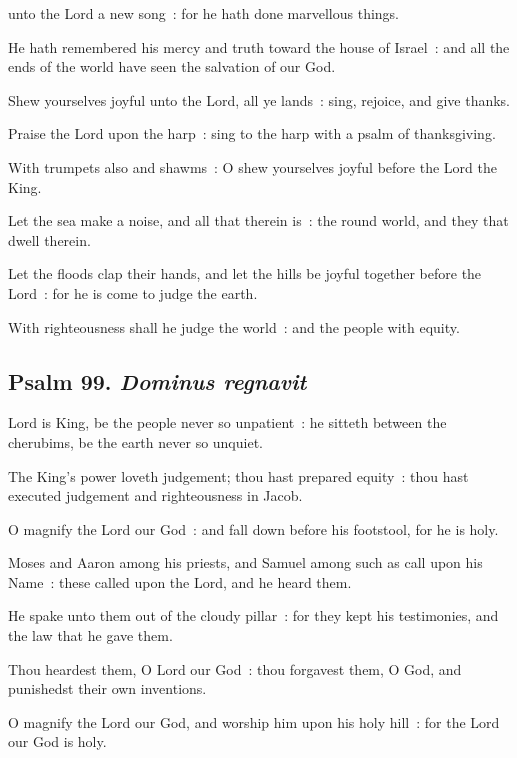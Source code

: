  unto the Lord a new song~: for he hath done marvellous things.\par
{}
He hath remembered his mercy and truth toward the house of Israel~: and all the ends of the world have seen the salvation of our God.\par
{}Shew yourselves joyful unto the Lord, all ye lands~: sing, rejoice, and give thanks.\par
{}Praise the Lord upon the harp~: sing to the harp with a psalm of thanksgiving.\par
{}With trumpets also and shawms~: O shew yourselves joyful before the Lord the King.\par
{}Let the sea make a noise, and all that therein is~: the round world, and they that dwell therein.\par
{}Let the floods clap their hands, and let the hills be joyful together before the Lord~: for he is come to judge the earth.\par
{}With righteousness shall he judge the world~: and the people with equity.\par

\subsection{Psalm 99. \textit{Dominus regnavit}}

 Lord is King, be the people never so unpatient~: he sitteth between the cherubims, be the earth never so unquiet.\par
{}
The King's power loveth judgement; thou hast prepared equity~: thou hast executed judgement and righteousness in Jacob.\par
{}O magnify the Lord our God~: and fall down before his footstool, for he is holy.\par
{}Moses and Aaron among his priests, and Samuel among such as call upon his Name~: these called upon the Lord, and he heard them.\par
{}He spake unto them out of the cloudy pillar~: for they kept his testimonies, and the law that he gave them.\par
{}Thou heardest them, O Lord our God~: thou forgavest them, O God, and punishedst their own inventions.\par
{}O magnify the Lord our God, and worship him upon his holy hill~: for the Lord our God is holy.\par

